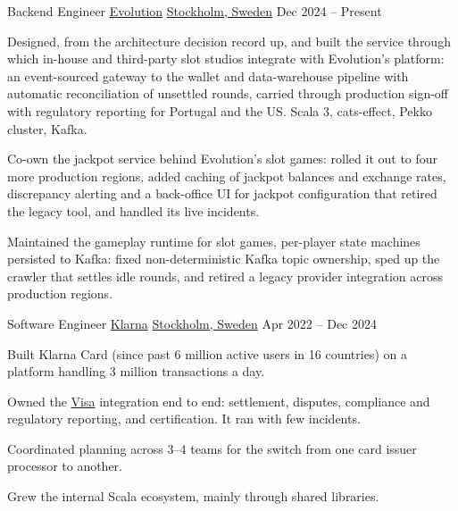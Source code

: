 
\begin{cventries}

	\cventry
	{Backend Engineer}
	{\href{https://www.linkedin.com/company/evolution-global}{Evolution}}
	{\href{https://www.google.com/maps/place/Stockholm}{Stockholm, Sweden}}
	{Dec 2024 -- Present}
	{
		\begin{cvitems}
			\item {Designed, from the architecture decision record up, and built the service through which in-house and third-party slot studios integrate with Evolution's platform: an event-sourced gateway to the wallet and data-warehouse pipeline with automatic reconciliation of unsettled rounds, carried through production sign-off with regulatory reporting for Portugal and the US. Scala 3, cats-effect, Pekko cluster, Kafka.}
			\item {Co-own the jackpot service behind Evolution's slot games: rolled it out to four more production regions, added caching of jackpot balances and exchange rates, discrepancy alerting and a back-office UI for jackpot configuration that retired the legacy tool, and handled its live incidents.}
			\item {Maintained the gameplay runtime for slot games, per-player state machines persisted to Kafka: fixed non-deterministic Kafka topic ownership, sped up the crawler that settles idle rounds, and retired a legacy provider integration across production regions.}
		\end{cvitems}
	}


	\cventry
	{Software Engineer}
	{\href{https://www.linkedin.com/company/klarna/}{Klarna}}
	{\href{https://www.google.com/maps/place/Stockholm}{Stockholm, Sweden}}
	{Apr 2022 -- Dec 2024}
	{
		\begin{cvitems}
			\item {Built Klarna Card (since past 6 million active users in 16 countries) on a platform handling 3 million transactions a day.}
			\item {Owned the \href{https://www.linkedin.com/company/visa/}{Visa} integration end to end: settlement, disputes, compliance and regulatory reporting, and certification. It ran with few incidents.}
			\item {Coordinated planning across 3--4 teams for the switch from one card issuer processor to another.}
			\item {Grew the internal Scala ecosystem, mainly through shared libraries.}
		\end{cvitems}
	}



\end{cventries}
